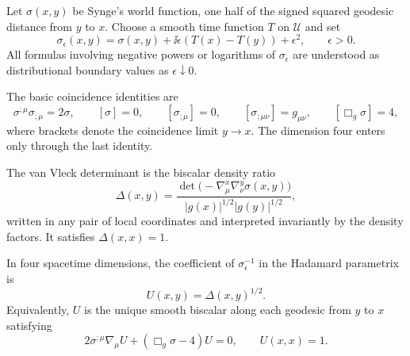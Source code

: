 \begin{definition}
\label{def:microlocal-synge-boundary-value}
Let \(\sigma(x,y)\) be Synge's world function, one half of the signed squared
geodesic distance from \(y\) to \(x\).  Choose a smooth time function \(T\) on
\(\mathcal U\) and set
\begin{equation}
  \sigma_\epsilon(x,y)
  =
  \sigma(x,y)+\ii\epsilon(T(x)-T(y))+\epsilon^2,
  \qquad \epsilon>0 .
  \label{eq:microlocal-sigma-epsilon}
\end{equation}
All formulas involving negative powers or logarithms of \(\sigma_\epsilon\)
are understood as distributional boundary values as \(\epsilon\downarrow0\).
\end{definition}

The basic coincidence identities are
\begin{equation}
  \sigma^{;\mu}\sigma_{;\mu}=2\sigma,\qquad
  [\sigma]=0,\qquad
  [\sigma_{;\mu}]=0,\qquad
  [\sigma_{;\mu\nu}]=g_{\mu\nu},\qquad
  [\Box_g\sigma]=4 ,
  \label{eq:microlocal-synge-coincidence}
\end{equation}
where brackets denote the coincidence limit \(y\to x\).  The dimension four
enters only through the last identity.

\begin{definition}
\label{def:microlocal-van-vleck}
The van Vleck determinant is the biscalar density ratio
\begin{equation}
  \Delta(x,y)
  =
  \frac{
  \det\!\bigl(-\nabla_\mu^x\nabla_\nu^y\sigma(x,y)\bigr)
  }{
  |g(x)|^{1/2}|g(y)|^{1/2}
  },
  \label{eq:microlocal-van-vleck}
\end{equation}
written in any pair of local coordinates and interpreted invariantly by the
density factors.  It satisfies \(\Delta(x,x)=1\).
\end{definition}

\begin{lemma}
\label{lem:microlocal-u-transport}
In four spacetime dimensions, the coefficient of \(\sigma_\epsilon^{-1}\) in
the Hadamard parametrix is
\begin{equation}
  U(x,y)=\Delta(x,y)^{1/2}.
  \label{eq:microlocal-u-delta}
\end{equation}
Equivalently, \(U\) is the unique smooth biscalar along each geodesic from
\(y\) to \(x\) satisfying
\begin{equation}
  2\sigma^{;\mu}\nabla_\mu U+(\Box_g\sigma-4)U=0,
  \qquad U(x,x)=1 .
  \label{eq:microlocal-u-transport}
\end{equation}
\end{lemma}

